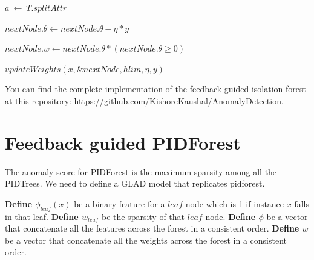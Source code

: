 \vspace{1em}
\begin{algorithm}[H]
    \caption{$updateWeights(x, T, hlim, \eta, y)$}
    \label{alg:update-weights-iforest}
    \DontPrintSemicolon
    \SetAlgoLined


    $a \: \leftarrow \: T.splitAttr$



    $nextNode.\theta \leftarrow nextNode.\theta - \eta * y$

    $nextNode.w \leftarrow nextNode.\theta * (nextNode.\theta \geq 0)$

    $updateWeights(x, \&nextNode, hlim, \eta, y)$
\end{algorithm}
\vspace{2em}

You can find the complete implementation of the  \href{https://github.com/KishoreKaushal/AnomalyDetection/blob/master/isolationforest/FeedbackIsolationForest.py}{feedback guided isolation forest} at this repository: \url{https://github.com/KishoreKaushal/AnomalyDetection}.



\section{Feedback guided PIDForest}
\label{sec:feedback-guided-pidforest}

The anomaly score for PIDForest is the maximum sparsity among all the PIDTrees.
We need to define a GLAD model that replicates pidforest.

\textbf{Define $\phi_{leaf}(x)$} be a binary feature for a $leaf$ node which is 1 if instance $x$ falls in that leaf.
\textbf{Define $w_{leaf}$} be the sparsity of that $leaf$ node.
\textbf{Define $\phi$}  be a vector that concatenate all the features across the forest in a consistent order.
\textbf{Define $w$}  be a vector that concatenate all the weights across the forest in a consistent order.

